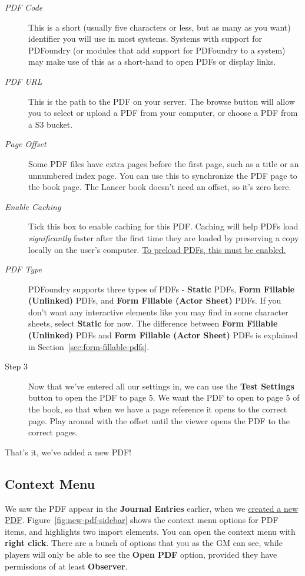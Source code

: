 \documentclass{article}
\begin{document}
\begin{description}
        \item [\textit{PDF Code}] This is a short (usually five characters or less, but as many as you want) identifier you will use in most systems. Systems with support for PDFoundry (or modules that add support for PDFoundry to a system) may make use of this as a short-hand to open PDFs or display links.

        \item [\textit{PDF URL}] This is the path to the PDF on your server. The browse button will allow you to select or upload a PDF from your computer, or choose a PDF from a S3 bucket.

        \item [\textit{Page Offset}] Some PDF files have extra pages before the first page, such as a title or an unnumbered index page. You can use this to synchronize the PDF page to the book page. The Lancer book doesn't need an offset, so it's zero here.

        \item [\textit{Enable Caching}] Tick this box to enable caching for this PDF. Caching will help PDFs load \textit{significantly} faster after the first time they are loaded by preserving a copy locally on the user's computer. \underline{To preload PDFs, this must be enabled.}

        \item [\textit{PDF Type}] PDFoundry supports three types of PDFs - \textbf{Static} PDFs, \textbf{Form Fillable (Unlinked)} PDFs, and \textbf{Form Fillable (Actor Sheet)} PDFs. If you don't want any interactive elements like you may find in some character sheets, select \textbf{Static} for now. The difference between \textbf{Form Fillable (Unlinked)} PDFs and \textbf{Form Fillable (Actor Sheet)} PDFs is explained in Section~\ref{sec:form-fillable-pdfs}.

        \item [Step 3] Now that we've entered all our settings in, we can use the \textbf{Test Settings} button to open the PDF to page 5. We want the PDF to open to page 5 of the book, so that when we have a page reference it opens to the correct page. Play around with the offset until the viewer opens the PDF to the correct pages.

    \end{description}

    That's it, we've added a new PDF!

    \subsection{Context Menu}
    We saw the PDF appear in the \textbf{Journal Entries} earlier, when we \hyperref[sec:creating-opening-pdfs]{created a new PDF}. Figure~\ref{fig:new-pdf-sidebar} shows the context menu options for PDF items, and highlights two import elements. You can open the context menu with \textbf{right click}. There are a bunch of options that you as the GM can see, while players will only be able to see the \textbf{Open PDF} option, provided they have permissions of at least \textbf{Observer}.
\end{document}
